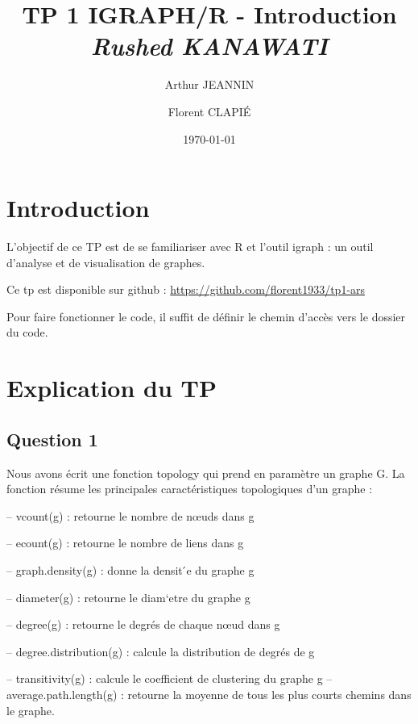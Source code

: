 \documentclass[12pt]{report}
\title{TP 1 IGRAPH/R - Introduction\\\emph{Rushed KANAWATI}}
\author{Arthur JEANNIN \and Florent CLAPIÉ}
\date{\today}
\begin{document}
\maketitle



\tableofcontents  \newpage  


\section{Introduction}

L'objectif de ce TP est de se familiariser avec R et l'outil igraph : un
outil d'analyse et de visualisation de graphes.

\textbf{}

Ce tp est disponible sur github :
\href{https://github.com/florent1933/tp1-ars}{https://github.com/florent1933/tp1-ars}

\textbf{}

Pour faire fonctionner le code, il suffit de définir le chemin d'accès
vers le dossier du code.

\section{Explication du TP}

\textbf{}

\subsection{Question 1}

\textbf{}

Nous avons écrit une fonction topology qui prend en paramètre un graphe
G. La fonction résume les principales caractéristiques topologiques d'un
graphe :

-- vcount(g) : retourne le nombre de nœuds dans g

-- ecount(g) : retourne le nombre de liens dans g

-- graph.density(g) : donne la densit ́e du graphe g

-- diameter(g) : retourne le diam`etre du graphe g

-- degree(g) : retourne le degrés de chaque nœud dans g

-- degree.distribution(g) : calcule la distribution de degrés de g

--  transitivity(g) : calcule le coefficient de clustering du graphe g
--  average.path.length(g) : retourne la moyenne de tous les plus courts
chemins dans le graphe.
\end{document}
